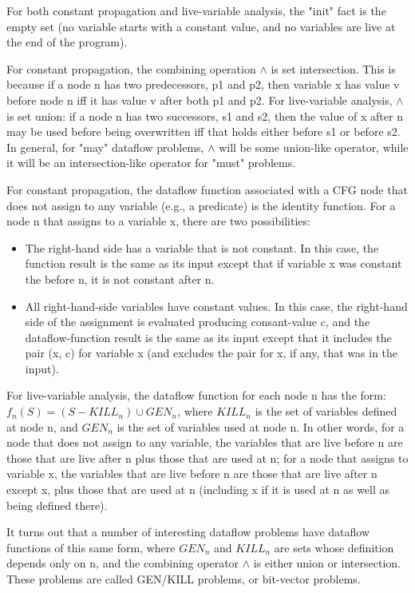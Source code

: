 For both constant propagation and live-variable analysis, the "init" fact is the empty set (no variable starts with a constant value, and no variables are live at the end of the program).

For constant propagation, the combining operation $\wedge$ is set intersection. This is because if a node n has two predecessors, p1 and p2, then variable x has value v before node n iff it has value v after both p1 and p2. For live-variable analysis, $\wedge$ is set union: if a node n has two successors, s1 and s2, then the value of x after n may be used before being overwritten iff that holds either before s1 or before s2. In general, for "may" dataflow problems, $\wedge$ will be some union-like operator, while it will be an intersection-like operator for "must" problems.

For constant propagation, the dataflow function associated with a CFG node that does not assign to any variable (e.g., a predicate) is the identity function. For a node n that assigns to a variable x, there are two possibilities:
\begin{itemize}
	\item The right-hand side has a variable that is not constant. In this case, the function result is the same as its input except that if variable x was constant the before n, it is not constant after n.
	\item All right-hand-side variables have constant values. In this case, the right-hand side of the assignment is evaluated producing consant-value c, and the dataflow-function result is the same as its input except that it includes the pair (x, c) for variable x (and excludes the pair for x, if any, that was in the input).

\end{itemize}
For live-variable analysis, the dataflow function for each node n has
the form: $f_n(S) = (S - KILL_n)  \cup  GEN_n$, where $KILL_n$
is the set of variables defined at node n, and $GEN_n$ is the set
of variables used at node n. In other words, for a node
that does not assign to any variable, the variables that
are live before n are those that are live after n plus those
that are used at n; for a node that assigns to variable x, the
variables that are live before n are those that are live after
n except x, plus those that are used at n (including x if it
is used at n as well as being defined there).



It turns out that a number of interesting dataflow problems
have dataflow functions of this same form, where $GEN_n$ and $KILL_n$
are sets whose definition depends only on n, and the combining
operator $\wedge$ is either union or intersection. These problems
are called GEN/KILL problems, or bit-vector problems.

